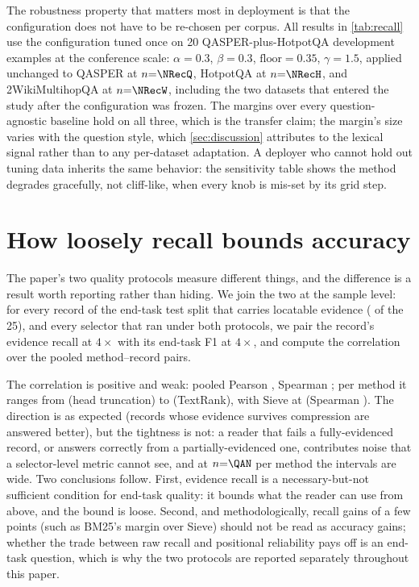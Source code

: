 \documentclass[review,12pt]{elsarticle}
\theoremstyle{remark}
\newcommand{\method}{Sieve}
\begin{document}
The robustness property that matters most in deployment is that the
configuration does not have to be re-chosen per corpus. All results in
\autoref{tab:recall} use the configuration tuned once on 20
QASPER-plus-HotpotQA development examples at the conference scale:
$\alpha=0.3$, $\beta=0.3$, $\mathrm{floor}=0.35$, $\gamma=1.5$,
applied unchanged to QASPER at $n{=}\NRecQ$, HotpotQA at
$n{=}\NRecH$, and 2WikiMultihopQA at $n{=}\NRecW$, including the two
datasets that entered the study after the configuration was frozen.
The margins over every question-agnostic baseline hold on all three,
which is the transfer claim; the margin's size varies with the
question style, which \autoref{sec:discussion} attributes to the
lexical signal rather than to any per-dataset adaptation. A deployer
who cannot hold out tuning data inherits the same behavior: the
sensitivity table shows the method degrades gracefully, not
cliff-like, when every knob is mis-set by its grid step.

\section{How loosely recall bounds accuracy}
\label{sec:corr}
The paper's two quality protocols measure different things, and the
difference is a result worth reporting rather than hiding. We join the
two at the sample level: for every record of the end-task test split
that carries locatable evidence (\CorrNRecs{} of the 25), and every
selector that ran under both protocols, we pair the record's evidence
recall at $4\times$ with its end-task F1 at $4\times$, and compute
the correlation over the pooled \CorrNPairs{} method--record pairs.

The correlation is positive and weak: pooled Pearson
\CorrPearson{}, Spearman \CorrSpearman{}; per method it ranges from
\CorrHeaPearson{} (head truncation) to \CorrTRPearson{} (TextRank),
with \method{} at \CorrSiePearson{} (Spearman \CorrSieSpearman{}).
The direction is as expected (records whose evidence survives
compression are answered better), but the tightness is not: a
reader that fails a fully-evidenced record, or answers correctly from
a partially-evidenced one, contributes noise that a selector-level
metric cannot see, and at $n{=}\QAN$ per method the intervals are wide.
Two conclusions follow. First, evidence recall is a necessary-but-not
sufficient condition for end-task quality: it bounds what the reader
can use from above, and the bound is loose. Second, and methodologically,
recall gains of a few points (such as BM25's margin over \method{})
should not be read as accuracy gains; whether the trade between
raw recall and positional reliability pays off is an end-task
question, which is why the two protocols are reported separately
throughout this paper.
\end{document}
